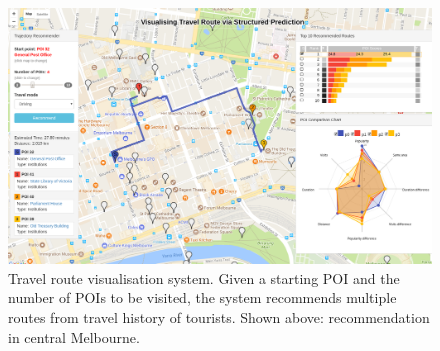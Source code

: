 \documentclass[sigconf]{acmart}
\begin{document}



\maketitle
 


 \begin{figure}
 \centering
   \includegraphics[width=\linewidth]{figure/sample_map.png} \vspace{-20pt}
     \caption{Travel route visualisation system\protect\footnotemark. 
     Given a starting POI and the number of POIs to be visited, the system recommends multiple routes from travel history of tourists. Shown above: recommendation in central Melbourne.}
     \label{fig:overview}\vspace{-1.5em}
 \end{figure}

 








%
\end{document}
